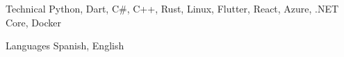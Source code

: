 
\begin{cvskills}

  \cvskill
    {Technical} %
    {Python, Dart, C\#, C++, Rust, Linux, Flutter, React, Azure, .NET Core, Docker} %





  \cvskill
    {Languages} %
    {Spanish, English} %

\end{cvskills}
